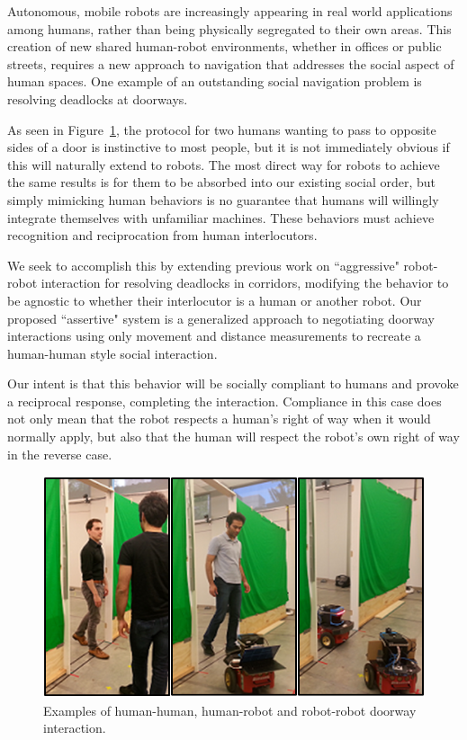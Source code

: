 \documentclass[letterpaper, 10 pt, conference]{ieeeconf}  %
\begin{document}
Autonomous, mobile robots are increasingly appearing in real world applications among humans, rather than being physically segregated to their own areas. This creation of new shared human-robot environments, whether in offices or public streets, requires a new approach to navigation that addresses the social aspect of human spaces. One example of an outstanding social navigation problem is resolving deadlocks at doorways. 

As seen in Figure~\ref{fig:Triptych}, the protocol for two humans wanting to pass to opposite sides of a door is instinctive to most people, but it is not immediately obvious if this will naturally extend to robots. The most direct way for robots to achieve the same results is for them to be absorbed into our existing social order, but simply mimicking human behaviors is no guarantee that humans will willingly integrate themselves with unfamiliar machines. These behaviors must achieve recognition and reciprocation from human interlocutors.

We seek to accomplish this by extending previous work on ``aggressive" robot-robot interaction\cite{c1} for resolving deadlocks in corridors, modifying the behavior to be agnostic to whether their interlocutor is a human or another robot. Our proposed ``assertive" system is a generalized approach to negotiating doorway interactions using only movement and distance measurements to recreate a human-human style social interaction.

Our intent is that this behavior will be socially compliant to humans and provoke a reciprocal response, completing the interaction. Compliance in this case does not only mean that the robot respects a human's right of way when it would normally apply, but also that the human will respect the robot's own right of way in the reverse case. 

   \begin{figure}
      \centering
      \includegraphics[scale=0.5]{Triptych.png}
      \caption{Examples of human-human, human-robot and robot-robot doorway interaction.}
      \label{fig:Triptych}
   \end{figure}
\end{document}

